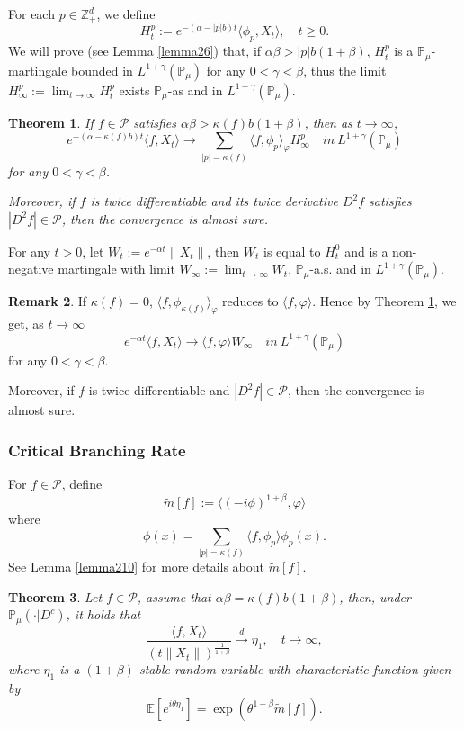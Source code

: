 \documentclass[12pt, a4paper]{amsart}
\newtheorem{thm}{Theorem}[section]
\theoremstyle{definition}
\newtheorem{rem}[thm]{Remark}
\numberwithin{equation}{section}
\begin{document}
For each $p\in \mathbb{Z}_+^d$, we define
$$H_t^p:= e^{-(\alpha-|p|b)t}\langle\phi_p,X_t\rangle,\quad t\geq 0.$$
 We will prove (see Lemma \ref{lemma26}) that, if $\alpha\beta>|p|b(1+\beta)$, $H_t^p$ is a $\mathbb{P}_{\mu}$-martingale bounded in $L^{1+\gamma}(\mathbb{P}_{\mu})$ for any $0<\gamma<\beta$, thus the limit $H^p_{\infty}:=\lim_{t\rightarrow \infty}H_t^p$ exists $\mathbb{P}_{\mu}$-as and in $L^{1+\gamma}(\mathbb{P}_{\mu})$.
 \begin{thm}\label{Theorem11}
     If $f \in \mathcal{P}$ satisfies $\alpha\beta>\kappa(f)b(1+\beta)$, then as $t\rightarrow \infty$,
     $$e^{-(\alpha-\kappa(f)b)t}\langle f, X_t\rangle \rightarrow\sum_{|p|=\kappa(f)}\langle f, \phi_p\rangle_{\varphi} H_{\infty}^p \quad in~ L^{1+\gamma}(\mathbb{P}_{\mu})$$
     for any $0<\gamma<\beta$.

     Moreover, if $f$ is twice differentiable and its twice derivative $D^2 f$ satisfies $|D^2 f| \in \mathcal{P}$, then the convergence is almost sure.
 \end{thm}
For any $t>0$, let $W_t:=e^{-\alpha t}\|X_t\|$, then $W_t$ is equal to $H_t^0$ and is a non-negative martingale with limit $W_{\infty}:=\lim_{t\rightarrow\infty}W_t$,  $\mathbb{P}_{\mu}$-a.s. and in $L^{1+\gamma}(\mathbb{P}_{\mu})$.
 \begin{rem}
    If $\kappa(f)=0$, $\langle f, \phi_{\kappa(f)}\rangle_{\varphi}$ reduces to $\langle f,\varphi\rangle$. Hence by Theorem \ref{Theorem11}, we get, as $t\rightarrow \infty$
     $$e^{-\alpha t}\langle f, X_t\rangle \rightarrow \langle f, \varphi\rangle W_{\infty} \quad in~ L^{1+\gamma}(\mathbb{P}_{\mu})$$
    for any $0<\gamma<\beta$.

    Moreover, if $f$ is twice differentiable and $|D^2 f| \in \mathcal{P}$, then the convergence is almost sure.
 \end{rem}

\subsubsection{Critical Branching Rate}
For $f\in \mathcal{P}$, define
$$\tilde{m}[f]:= \langle(-i\phi)^{1+\beta},\varphi\rangle$$
where
$$\phi(x)=\sum_{|p|=\kappa(f)}\langle f,\phi_p\rangle\phi_p(x).$$
See Lemma \ref{lemma210} for more details about $\tilde{m}[f]$.
\begin{thm}\label{Theorem12}
Let $f\in\mathcal{P}$, assume that  $\alpha\beta=\kappa(f)b(1+\beta)$, then, under $\mathbb{P}_{\mu}(\cdot|D^c)$, it holds that
$$\frac{\langle f,X_t\rangle}{\left(t\|X_t\|\right)^{\frac{1}{1+\beta}}}\xrightarrow{d} \eta_1, \quad t\rightarrow \infty,$$
where $\eta_1$ is a $(1+\beta)$-stable random variable with characteristic function given by
$$\mathbb{E} [e^{i\theta \eta_1}]=\exp(\theta^{1+\beta}\tilde{m}[f]).$$
\end{thm}
\end{document}
